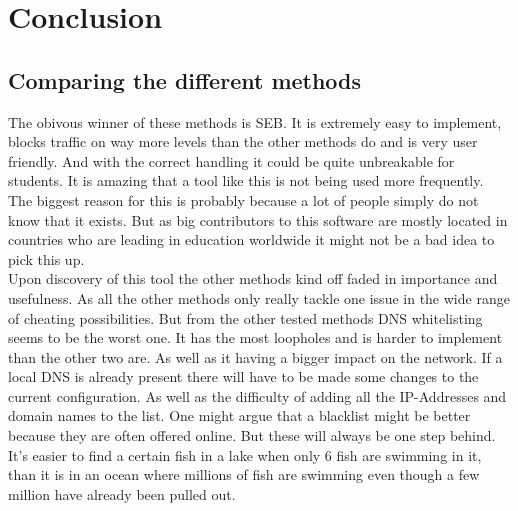 
\chapter{Conclusion}
\label{ch:conclusie}


\section{Comparing the different methods}
The obivous winner of these methods is SEB. It is extremely easy to implement, blocks traffic on way more levels than the other methods do and is very user friendly. And with the correct handling it could be quite unbreakable for students. It is amazing that a tool like this is not being used more frequently. The biggest reason for this is probably because a lot of people simply do not know that it exists. But as big contributors to this software are mostly located in countries who are leading in education worldwide it might not be a bad idea to pick this up.\\

Upon discovery of this tool the other methods kind off faded in importance and usefulness. As all the other methods only really tackle one issue in the wide range of cheating possibilities. But from the other tested methods DNS whitelisting seems to be the worst one. It has the most loopholes and is harder to implement than the other two are. As well as it having a bigger impact on the network. If a local DNS is already present there will have to be made some changes to the current configuration. As well as the difficulty  of adding all the IP-Addresses and domain names to the list. One might argue that a blacklist might be better because they are often offered online. But these will always be one step behind. It's easier to find a certain fish in a lake when only 6 fish are swimming in it, than it is in an ocean where millions of fish are swimming even though a few million have already been pulled out.\\

